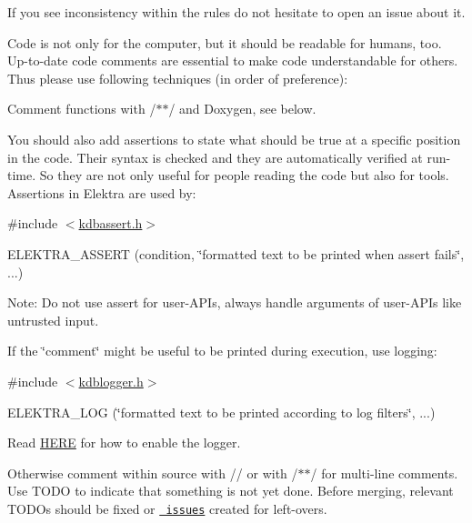 If you see inconsistency within the rules do not hesitate to open an issue about it.

Code is not only for the computer, but it should be readable for humans, too. Up-\/to-\/date code comments are essential to make code understandable for others. Thus please use following techniques (in order of preference)\+:


\begin{DoxyEnumerate}
\item Comment functions with {\ttfamily /$\ast$$\ast$/} and Doxygen, see below.
\item You should also add assertions to state what should be true at a specific position in the code. Their syntax is checked and they are automatically verified at run-\/time. So they are not only useful for people reading the code but also for tools. Assertions in Elektra are used by\+:

{\ttfamily \#include $<$\mbox{\hyperlink{kdbassert_8h}{kdbassert.\+h}}$>$}

{\ttfamily E\+L\+E\+K\+T\+R\+A\+\_\+\+A\+S\+S\+E\+RT (condition, \char`\"{}formatted text to be printed when assert fails\char`\"{}, ...)}

Note\+: Do not use assert for user-\/\+A\+P\+Is, always handle arguments of user-\/\+A\+P\+Is like untrusted input.
\item If the \char`\"{}comment\char`\"{} might be useful to be printed during execution, use logging\+:

{\ttfamily \#include $<$\mbox{\hyperlink{kdblogger_8h}{kdblogger.\+h}}$>$}

{\ttfamily E\+L\+E\+K\+T\+R\+A\+\_\+\+L\+OG (\char`\"{}formatted text to be printed according to log filters\char`\"{}, ...)}

Read \mbox{\hyperlink{doc_dev_logging_md}{H\+E\+RE}} for how to enable the logger.
\item Otherwise comment within source with {\ttfamily //} or with {\ttfamily /$\ast$$\ast$/} for multi-\/line comments. Use {\ttfamily T\+O\+DO} to indicate that something is not yet done. Before merging, relevant {\ttfamily T\+O\+DO}s should be fixed or \href{https://issues.libelektra.org}{\texttt{ issues}} created for left-\/overs.
\end{DoxyEnumerate}


